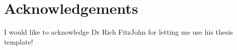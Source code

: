 \chapter*{Acknowledgements}

I would like to acknowledge Dr Rich FitzJohn for letting me use his thesis template!

